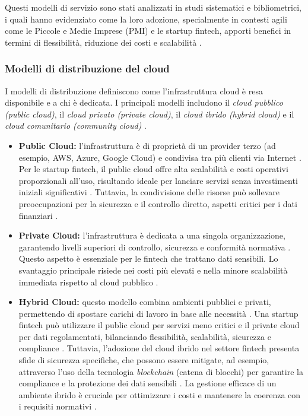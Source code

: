 Questi modelli di servizio sono stati analizzati in studi sistematici e bibliometrici, i quali hanno evidenziato come la loro adozione, specialmente in contesti agili come le Piccole e Medie Imprese (PMI) e le startup fintech, apporti benefici in termini di flessibilità, riduzione dei costi e scalabilità \cite{vats2024systematic, hrmars2025cloud}.

\subsubsection{Modelli di distribuzione del cloud}

I modelli di distribuzione definiscono come l'infrastruttura cloud è resa disponibile e a chi è dedicata. I principali modelli includono il \textit{cloud pubblico (public cloud)}, il \textit{cloud privato (private cloud)}, il \textit{cloud ibrido (hybrid cloud)} e il \textit{cloud comunitario (community cloud)} \cite{maticmind2024hybrid, iso2018overview}.

\begin{itemize}
    \item \textbf{Public Cloud:} l'infrastruttura è di proprietà di un provider terzo (ad esempio, AWS, Azure, Google Cloud) e condivisa tra più clienti via Internet \cite{maticmind2024hybrid}. Per le startup fintech, il public cloud offre alta scalabilità e costi operativi proporzionali all'uso, risultando ideale per lanciare servizi senza investimenti iniziali significativi \cite{maticmind2024hybrid}. Tuttavia, la condivisione delle risorse può sollevare preoccupazioni per la sicurezza e il controllo diretto, aspetti critici per i dati finanziari \cite{vats2024systematic, maticmind2024hybrid}.
    
    \item \textbf{Private Cloud:} l'infrastruttura è dedicata a una singola organizzazione, garantendo livelli superiori di controllo, sicurezza e conformità normativa \cite{maticmind2024hybrid}. Questo aspetto è essenziale per le fintech che trattano dati sensibili. Lo svantaggio principale risiede nei costi più elevati e nella minore scalabilità immediata rispetto al cloud pubblico \cite{maticmind2024hybrid}.
    
    \item \textbf{Hybrid Cloud:} questo modello combina ambienti pubblici e privati, permettendo di spostare carichi di lavoro in base alle necessità \cite{maticmind2024hybrid}. Una startup fintech può utilizzare il public cloud per servizi meno critici e il private cloud per dati regolamentati, bilanciando flessibilità, scalabilità, sicurezza e compliance \cite{maticmind2024hybrid}. Tuttavia, l'adozione del cloud ibrido nel settore fintech presenta sfide di sicurezza specifiche, che possono essere mitigate, ad esempio, attraverso l'uso della tecnologia \textit{blockchain} (catena di blocchi) per garantire la compliance e la protezione dei dati sensibili \cite{urf2024security, vats2024systematic}. La gestione efficace di un ambiente ibrido è cruciale per ottimizzare i costi e mantenere la coerenza con i requisiti normativi \cite{maticmind2024hybrid}.
\end{itemize}

